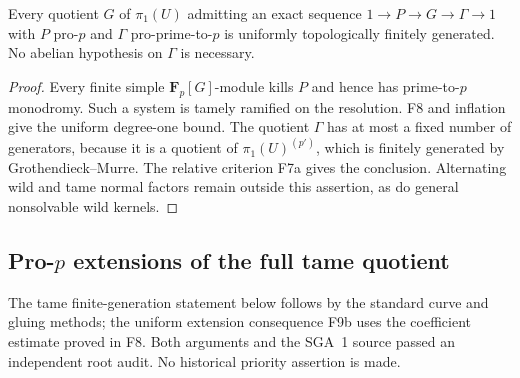 \begin{corollary}
Every quotient $G$ of $\pi_1(U)$ admitting an
exact sequence $1\to P\to G\to\Gamma\to1$ with $P$ pro-$p$ and
$\Gamma$ pro-prime-to-$p$ is uniformly topologically finitely
generated. No abelian hypothesis on $\Gamma$ is necessary.
\end{corollary}
\begin{proof}
Every finite simple $\mathbf F_p[G]$-module kills $P$ and hence has
prime-to-$p$ monodromy. Such a system is tamely ramified on the
resolution. F8 and inflation give the uniform degree-one bound.
The quotient $\Gamma$ has at most a fixed number of generators,
because it is a quotient of $\pi_1(U)^{(p')}$, which is finitely
generated by Grothendieck--Murre. The relative criterion F7a gives
the conclusion. Alternating wild and tame normal factors remain
outside this assertion, as do general nonsolvable wild kernels.
\end{proof}

\subsection{Pro-$p$ extensions of the full tame quotient}

The tame finite-generation statement below follows by the standard
curve and gluing methods; the uniform extension consequence F9b
uses the coefficient estimate proved in F8. Both arguments and the
SGA~1 source passed an independent root audit. No historical
priority assertion is made.

